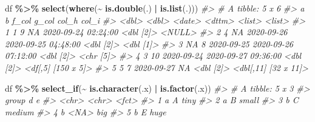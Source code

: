 \documentclass[
]{report}
\newenvironment{Shaded}{\begin{snugshade}}{\end{snugshade}}
\newcommand{\CommentTok}[1]{\textcolor[rgb]{0.56,0.35,0.01}{\textit{#1}}}
\newcommand{\KeywordTok}[1]{\textcolor[rgb]{0.13,0.29,0.53}{\textbf{#1}}}
\newcommand{\NormalTok}[1]{#1}
\newcommand{\OperatorTok}[1]{\textcolor[rgb]{0.81,0.36,0.00}{\textbf{#1}}}
\newcommand{\StringTok}[1]{\textcolor[rgb]{0.31,0.60,0.02}{#1}}
\begin{document}
\begin{Shaded}
\begin{Highlighting}[]
\NormalTok{df }\OperatorTok{\%\textgreater{}\%}
\StringTok{  }\KeywordTok{select}\NormalTok{(}\KeywordTok{where}\NormalTok{(}\OperatorTok{\textasciitilde{}}\StringTok{ }\KeywordTok{is.double}\NormalTok{(.) }\OperatorTok{|}\StringTok{ }\KeywordTok{is.list}\NormalTok{(.)))}
\CommentTok{\#\textgreater{} \# A tibble: 5 x 6}
\CommentTok{\#\textgreater{}       a     b f\_col      g\_col               col\_h     col\_i               }
\CommentTok{\#\textgreater{}   \textless{}dbl\textgreater{} \textless{}dbl\textgreater{} \textless{}date\textgreater{}     \textless{}dttm\textgreater{}              \textless{}list\textgreater{}    \textless{}list\textgreater{}              }
\CommentTok{\#\textgreater{} 1     1     9 NA         2020{-}09{-}24 02:24:00 \textless{}dbl [2]\textgreater{} \textless{}NULL\textgreater{}              }
\CommentTok{\#\textgreater{} 2     4    NA 2020{-}09{-}26 2020{-}09{-}25 04:48:00 \textless{}dbl [2]\textgreater{} \textless{}dbl [1]\textgreater{}           }
\CommentTok{\#\textgreater{} 3    NA     8 2020{-}09{-}25 2020{-}09{-}26 07:12:00 \textless{}dbl [2]\textgreater{} \textless{}chr [5]\textgreater{}           }
\CommentTok{\#\textgreater{} 4     3    10 2020{-}09{-}24 2020{-}09{-}27 09:36:00 \textless{}dbl [2]\textgreater{} \textless{}df[,5] [150 x 5]\textgreater{}  }
\CommentTok{\#\textgreater{} 5     5     7 2020{-}09{-}27 NA                  \textless{}dbl [2]\textgreater{} \textless{}dbl[,11] [32 x 11]\textgreater{}}
\end{Highlighting}
\end{Shaded}

\begin{Shaded}
\begin{Highlighting}[]
\NormalTok{df }\OperatorTok{\%\textgreater{}\%}
\StringTok{  }\KeywordTok{select\_if}\NormalTok{(}\OperatorTok{\textasciitilde{}}\StringTok{ }\KeywordTok{is.character}\NormalTok{(.x) }\OperatorTok{|}\StringTok{ }\KeywordTok{is.factor}\NormalTok{(.x))}
\CommentTok{\#\textgreater{} \# A tibble: 5 x 3}
\CommentTok{\#\textgreater{}   group d     e     }
\CommentTok{\#\textgreater{}   \textless{}chr\textgreater{} \textless{}chr\textgreater{} \textless{}fct\textgreater{} }
\CommentTok{\#\textgreater{} 1 a     A     tiny  }
\CommentTok{\#\textgreater{} 2 a     B     small }
\CommentTok{\#\textgreater{} 3 b     C     medium}
\CommentTok{\#\textgreater{} 4 b     \textless{}NA\textgreater{}  big   }
\CommentTok{\#\textgreater{} 5 b     E     huge}
\end{Highlighting}
\end{Shaded}
\end{document}
